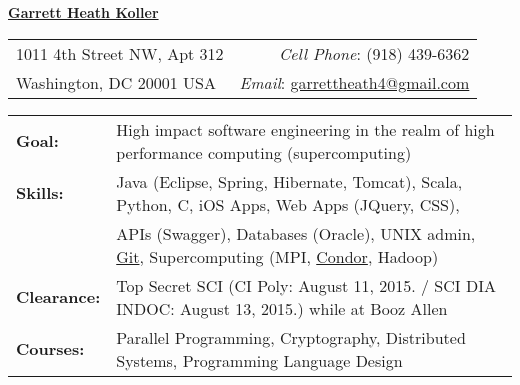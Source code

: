 \documentclass[11pt, letterpaper]{letter}
\newlength{\firstSectionSpacing}	\setlength{\firstSectionSpacing}{6pt}
\newlength{\sectionSpacing}			\setlength{\sectionSpacing}{-1pt}
\begin{document}
\sffamily

\begin{center}
\underline{\Large{\textbf{Garrett Heath Koller}}}
\end{center}
\vspace{-8pt}
\begin{tabular*}{\textwidth}{l@{\extracolsep{\fill}}r}
1011 4th Street NW, Apt 312 & \textit{Cell Phone}: (918) 439-6362 \\
Washington, DC  20001 USA & \textit{Email}:
\href{mailto:garrettheath4@gmail.com}{garrettheath4@gmail.com} \\
\hline
\end{tabular*}

\vspace{\firstSectionSpacing}


\begin{tabular*}{\textwidth}{ p{2.2cm} l }
{\large \textbf{Goal:}}      & High impact software engineering in the realm of 
                               high performance computing (supercomputing) \\
{\large \textbf{Skills:}}    & Java (Eclipse, Spring, Hibernate, Tomcat), Scala, Python, C,
                               iOS Apps, Web Apps (JQuery, CSS), \\
                             & APIs (Swagger), Databases (Oracle), UNIX admin, 
                               \href{https://github.com/garrettheath4}{Git},
                               Supercomputing (MPI, \href{http://www.htcondorproject.org/}{Condor},
                               Hadoop) \\
{\large \textbf{Clearance:}} & Top Secret SCI (CI Poly: August 11, 2015.  /  SCI DIA INDOC: August 13, 2015.) while at Booz Allen \\
{\large \textbf{Courses:}}   & Parallel Programming, Cryptography, 
                               Distributed Systems, Programming Language Design
\end{tabular*}

\vspace{\firstSectionSpacing}
\vspace{\sectionSpacing}

\end{document}

